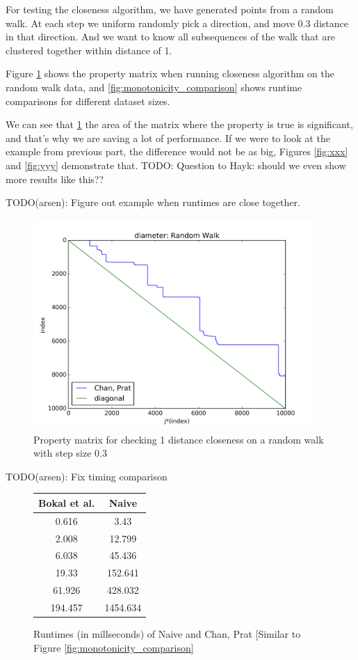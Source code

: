 \documentclass{article}
\begin{document}
For testing the closeness algorithm, we have generated points from a random walk.
At each step we uniform randomly pick a direction, and move 0.3
distance in that direction. And we want to know all subsequences
of the walk that are clustered together within distance of 1.

Figure \ref{fig:diameter_demo} shows the property matrix when running
closeness algorithm on the random walk data, and
\ref{fig:monotonicity_comparison} shows runtime comparisons for
different dataset sizes.

We can see that \ref{fig:diameter_demo} the area of the matrix where
the property is true is significant, and that's why we are saving
a lot of performance. If we were to look at the example from previous
part, the difference would not be as big, Figures \ref{fig:xxx} and
\ref{fig:yyy} demonstrate that. TODO: Question to Hayk: should we even show more results like this??

TODO(arsen): Figure out example when runtimes are close together.

\begin{figure}[!h]
  \centering
  \includegraphics[height=8cm]{../plots/diameter_random_walk}
  \caption{Property matrix for checking 1 distance closeness on a random walk with step size 0.3}
  \label{fig:diameter_demo}
\end{figure}

TODO(arsen): Fix timing comparison 

\begin{figure}[!ht]
  \centering
    \begin{tabular}{c|c}
        Bokal et al. & Naive \\
        \hline
        0.616     &    3.43 \\
        \hline
        2.008     &    12.799 \\
        \hline
        6.038     & 45.436 \\
        \hline
        19.33     & 152.641 \\
        \hline
        61.926    & 428.032 \\
        \hline
        194.457   & 1454.634
    \end{tabular}
  \caption{Runtimes (in millseconds) of Naive and Chan, Prat [Similar to Figure \ref{fig:monotonicity_comparison}}
  \label{fig:diameter_comparison}
\end{figure}
\end{document}
